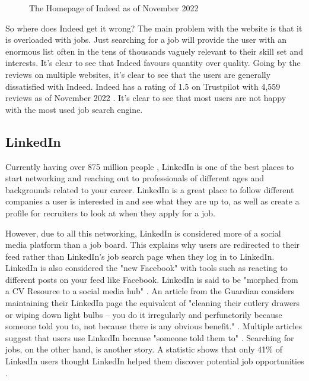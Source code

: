 \begin{itemize}
\begin{figure}
        \decoRule
        \caption[Indeed's Homepage]{The Homepage of Indeed as of November 2022}
        \label{fig:Indeed Homepage}
    \end{figure}
\end{itemize}

So where does Indeed get it wrong? The main problem with the website is that it is overloaded with jobs. Just searching for a job will provide the user with an enormous list often in the tens of thousands vaguely relevant to their skill set and interests. It's clear to see that Indeed favours quantity over quality. Going by the reviews \parencite{Reference8} on multiple websites, it's clear to see that the users are generally dissatisfied with Indeed. Indeed has a rating of 1.5 on Trustpilot with 4,559 reviews as of November 2022 \parencite{Reference9}. It's clear to see that most users are not happy with the most used job search engine.

\subsection{LinkedIn}
Currently having over 875 million people \parencite{Reference10}, LinkedIn is one of the best places to start networking and reaching out to professionals of different ages and backgrounds related to your career. LinkedIn is a great place to follow different companies a user is interested in and see what they are up to, as well as create a profile for recruiters to look at when they apply for a job. 

However, due to all this networking, LinkedIn is considered more of a social media platform than a job board. This explains why users are redirected to their feed rather than LinkedIn's job search page when they log in to LinkedIn. LinkedIn is also considered the "new Facebook" with tools such as reacting to different posts on your feed like Facebook. LinkedIn is said to be "morphed from a CV Resource to a social media hub" \parencite{Reference14}. An article from the Guardian considers maintaining their LinkedIn page the equivalent of "cleaning their cutlery drawers or wiping down light bulbs – you do it irregularly and perfunctorily because someone told you to, not because there is any obvious benefit." \parencite{Reference11}. Multiple articles suggest that users use LinkedIn because "someone told them to" \parencite{Reference12}. Searching for jobs, on the other hand, is another story. A statistic shows that only 41\% of LinkedIn users thought LinkedIn helped them discover potential job opportunities \parencite{Reference13}. 

